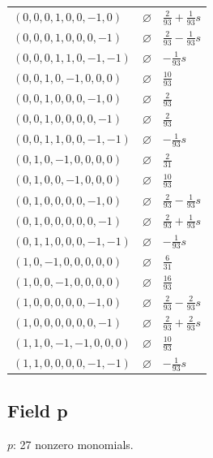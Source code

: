 \begin{longtable}{@{}lll@{}}
$(0,0,0,1,0,0,-1,0)$ & $\varnothing$ & $\frac{2}{93}+\frac{1}{93}s$\\
$(0,0,0,1,0,0,0,-1)$ & $\varnothing$ & $\frac{2}{93}-\frac{1}{93}s$\\
$(0,0,0,1,1,0,-1,-1)$ & $\varnothing$ & $-\frac{1}{93}s$\\
$(0,0,1,0,-1,0,0,0)$ & $\varnothing$ & $\frac{10}{93}$\\
$(0,0,1,0,0,0,-1,0)$ & $\varnothing$ & $\frac{2}{93}$\\
$(0,0,1,0,0,0,0,-1)$ & $\varnothing$ & $\frac{2}{93}$\\
$(0,0,1,1,0,0,-1,-1)$ & $\varnothing$ & $-\frac{1}{93}s$\\
$(0,1,0,-1,0,0,0,0)$ & $\varnothing$ & $\frac{2}{31}$\\
$(0,1,0,0,-1,0,0,0)$ & $\varnothing$ & $\frac{10}{93}$\\
$(0,1,0,0,0,0,-1,0)$ & $\varnothing$ & $\frac{2}{93}-\frac{1}{93}s$\\
$(0,1,0,0,0,0,0,-1)$ & $\varnothing$ & $\frac{2}{93}+\frac{1}{93}s$\\
$(0,1,1,0,0,0,-1,-1)$ & $\varnothing$ & $-\frac{1}{93}s$\\
$(1,0,-1,0,0,0,0,0)$ & $\varnothing$ & $\frac{6}{31}$\\
$(1,0,0,-1,0,0,0,0)$ & $\varnothing$ & $\frac{16}{93}$\\
$(1,0,0,0,0,0,-1,0)$ & $\varnothing$ & $\frac{2}{93}-\frac{2}{93}s$\\
$(1,0,0,0,0,0,0,-1)$ & $\varnothing$ & $\frac{2}{93}+\frac{2}{93}s$\\
$(1,1,0,-1,-1,0,0,0)$ & $\varnothing$ & $\frac{10}{93}$\\
$(1,1,0,0,0,0,-1,-1)$ & $\varnothing$ & $-\frac{1}{93}s$\\
\end{longtable}
\endgroup

\subsection{Field p}
$p$: 27 nonzero monomials.

